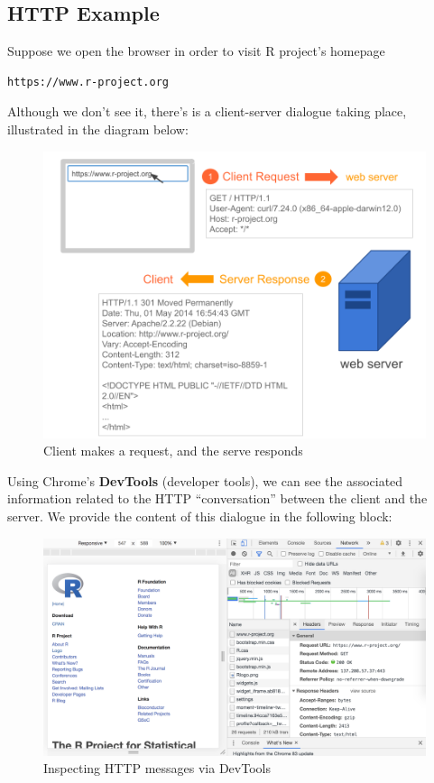\documentclass[
]{book}
\begin{document}
\hypertarget{http-example}{%
\subsection{HTTP Example}\label{http-example}}

Suppose we open the browser in order to visit R project's homepage

\begin{verbatim}
https://www.r-project.org
\end{verbatim}

Although we don't see it, there's is a client-server dialogue taking place,
illustrated in the diagram below:

\begin{figure}

{\centering \includegraphics[width=0.7\linewidth]{images/http/web-scheme6} 

}

\caption{Client makes a request, and the serve responds}\label{fig:unnamed-chunk-10}
\end{figure}

Using Chrome's \textbf{DevTools} (developer tools), we can see the associated
information related to the HTTP ``conversation'' between the client and the
server. We provide the content of this dialogue in the following block:

\begin{figure}

{\centering \includegraphics[width=0.9\linewidth]{images/http/web-http-devtools} 

}

\caption{Inspecting HTTP messages via DevTools}\label{fig:unnamed-chunk-11}
\end{figure}
\end{document}
